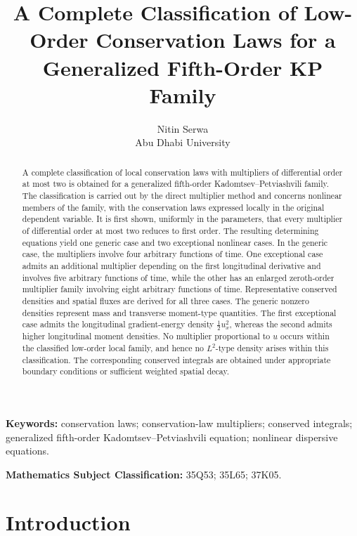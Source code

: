 \documentclass[11pt]{article}
\title{A Complete Classification of Low-Order Conservation Laws
for a Generalized Fifth-Order KP Family}
\author{
Nitin Serwa\\Abu Dhabi University
}
\date{}
\numberwithin{equation}{section}
\theoremstyle{definition}
\theoremstyle{remark}
\begin{document}

\maketitle


\begin{abstract}
A complete classification of local conservation laws with multipliers
of differential order at most two is obtained for a generalized
fifth-order Kadomtsev--Petviashvili family. The classification is
carried out by the direct multiplier method and concerns nonlinear
members of the family, with the conservation laws expressed locally
in the original dependent variable. It is first shown, uniformly in
the parameters, that every multiplier of differential order at most
two reduces to first order. The resulting determining equations yield
one generic case and two exceptional nonlinear cases. In the generic
case, the multipliers involve four arbitrary functions of time. One
exceptional case admits an additional multiplier depending on the
first longitudinal derivative and involves five arbitrary functions
of time, while the other has an enlarged zeroth-order multiplier
family involving eight arbitrary functions of time. Representative conserved densities and spatial fluxes are derived for
all three cases. The generic nonzero densities represent mass and
transverse moment-type quantities. The first exceptional case admits
the longitudinal gradient-energy density $\tfrac12 u_x^2$, whereas
the second admits higher longitudinal moment densities. No multiplier
proportional to $u$ occurs within the classified low-order local
family, and hence no $L^2$-type density arises within this
classification. The corresponding conserved integrals are obtained
under appropriate boundary conditions or sufficient weighted spatial
decay.
\end{abstract}


\medskip

\noindent
\textbf{Keywords:}
conservation laws; conservation-law multipliers; conserved integrals;
generalized fifth-order Kadomtsev--Petviashvili equation; nonlinear
dispersive equations.


\medskip

\noindent
\textbf{Mathematics Subject Classification:}
35Q53; 35L65; 37K05.

\section{Introduction}
\label{sec:introduction}
\end{document}
